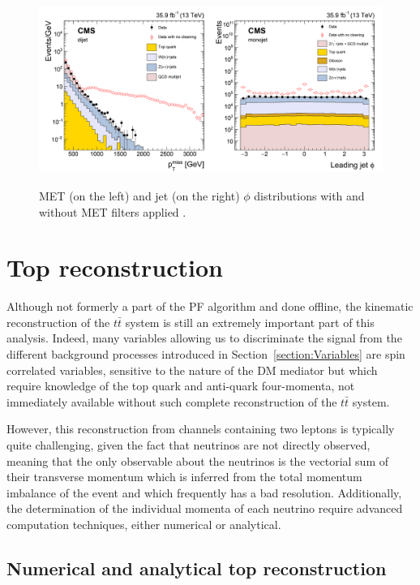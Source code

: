 \documentclass[a4paper, 10pt, openright]{report}
\begin{document}
\begin{figure}[htbp]
\begin{center}
\includegraphics[width=14cm, height=6.2cm]{figs/METFilters.png}
\caption{\ac{MET} (on the left) and jet (on the right) $\phi$ distributions with and without \ac{MET} filters applied \cite{METReco}.}
\label{fig:METFilters}
\end{center}
\end{figure}

\section{Top reconstruction} \label{section:RecoTop}

Although not formerly a part of the \ac{PF} algorithm and done offline, the kinematic reconstruction of the $t \bar t$ system is still an extremely important part of this analysis. Indeed, many variables allowing us to discriminate the signal from the different background processes introduced in Section~\ref{section:Variables} are spin correlated variables, sensitive to the nature of the \ac{DM} mediator but which require knowledge of the top quark and anti-quark four-momenta, not immediately available without such complete reconstruction of the $t \bar t$ system. 

However, this reconstruction from channels containing two leptons is typically quite challenging, given the fact that neutrinos are not directly observed, meaning that the only observable about the neutrinos is the vectorial sum of their transverse momentum which is inferred from the total momentum imbalance of the event and which frequently has a bad resolution. Additionally, the determination of the individual momenta of each neutrino require advanced computation techniques, either numerical or analytical.

\subsection{Numerical and analytical top reconstruction}
\end{document}
